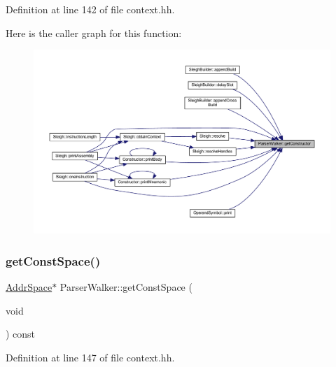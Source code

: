 Definition at line 142 of file context.\+hh.

Here is the caller graph for this function\+:
\nopagebreak
\begin{figure}[H]
\begin{center}
\leavevmode
\includegraphics[width=350pt]{class_parser_walker_a3d8f48e605938ba8faef8a92cb816b4f_icgraph}
\end{center}
\end{figure}
\mbox{\label{class_parser_walker_ab353bd7e91219577f2d9aff400e84c80}} 
\subsubsection{\texorpdfstring{getConstSpace()}{getConstSpace()}}
{\footnotesize\ttfamily \mbox{\hyperlink{class_addr_space}{Addr\+Space}}$\ast$ Parser\+Walker\+::get\+Const\+Space (\begin{DoxyParamCaption}\item[{void}]{ }\end{DoxyParamCaption}) const\hspace{0.3cm}{\ttfamily [inline]}}



Definition at line 147 of file context.\+hh.

